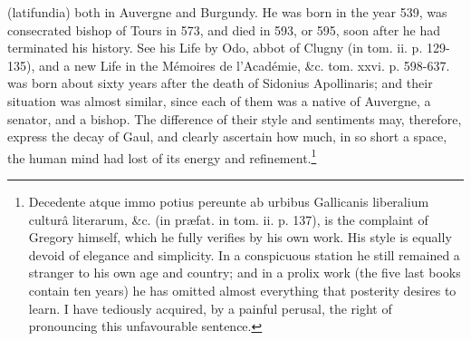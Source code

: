 {(latifundia) both in Auvergne and Burgundy. He was born in the year 539, was consecrated bishop of Tours in 573, and died in 593, or 595, soon after he had terminated his history. See his Life by Odo, abbot of Clugny (in tom. ii. p. 129-135), and a new Life in the Mémoires de l\texthebrew{}’Académie, \&c. tom. xxvi. p. 598-637.} was born about sixty years after the death of Sidonius Apollinaris; and their situation was almost similar, since each of them was a native of Auvergne, a senator, and a bishop. The difference of their style and sentiments may, therefore, express the decay of Gaul, and clearly ascertain how much, in so short a space, the human mind had lost of its energy and refinement.\footnote{Decedente atque immo potius pereunte ab urbibus Gallicanis liberalium culturâ literarum, \&c. (in præfat. in tom. ii. p. 137), is the complaint of Gregory himself, which he fully verifies by his own work. His style is equally devoid of elegance and simplicity. In a conspicuous station he still remained a stranger to his own age and country; and in a prolix work (the five last books contain ten years) he has omitted almost everything that posterity desires to learn. I have tediously acquired, by a painful perusal, the right of pronouncing this unfavourable sentence.}

